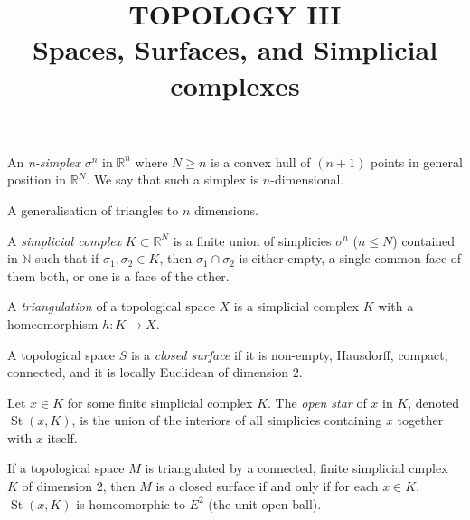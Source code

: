\documentclass[a4paper]{article}
\begin{document}
\title{TOPOLOGY III \\ Spaces, Surfaces, and Simplicial complexes}
\maketitle

\begin{definition}[$n$-simplex]
	An \emph{n-simplex} $\sigma^n$ in $\mathbb R^n$
	where $N \geq n$ is a convex hull of $(n+1)$ points
	in general position in $\mathbb R^N$. We say that such a simplex is
	$n$-dimensional.
\end{definition}

A generalisation of triangles to $n$ dimensions.

\begin{definition}
	A \emph{simplicial complex} $K \subset \mathbb R^N$ is a finite
	union of simplicies $\sigma^n$ ($n \leq N$) contained in $\mathbb N$
	such that if $\sigma_1, \sigma_2 \in K$, then $\sigma_1 \cap \sigma_2$
	is either empty, a single common face of them both, or one is a face of 
	the other.
\end{definition}

\begin{definition}[Triangulation]
	A \emph{triangulation} of a topological space $X$ is a simplicial
	complex $K$ with a homeomorphism $h:K \to X$.
\end{definition}

\begin{definition}
	A topological space $S$ is a \emph{closed surface} if it is
	non-empty, Hausdorff, compact, connected, and it is locally Euclidean
	of dimension $2$.
\end{definition}

\begin{definition}
	Let $x \in K$ for some finite simplicial complex $K$.
	The \emph{open star} of $x$ in $K$, denoted $\operatorname{St}(x,K)$,
	is the union of the interiors of all simplicies containing $x$
	together with $x$ itself.
\end{definition}

\begin{lemma}
	If a topological space $M$ is triangulated by a connected,
	finite simplicial cmplex $K$ of dimension $2$, then $M$ is a closed
	surface if and only if for each $x \in K$, $\operatorname{St}(x,K)$
	is homeomorphic to $E^2$ (the unit open ball).
\end{lemma}
\end{document}
